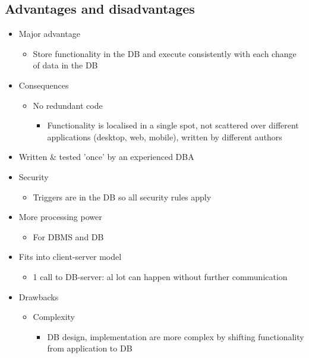 \documentclass{report}
\begin{document}
    \subsection{Advantages and disadvantages}
    \begin{itemize}
        \item Major advantage
        \begin{itemize}
            \item Store functionality in the DB and execute consistently with each change of data in the DB
        \end{itemize}
        \item Consequences
        \begin{itemize}
            \item No redundant code
            \begin{itemize}
                \item Functionality is localised in a single spot, not scattered over different applications (desktop, web, mobile), written by different authors
            \end{itemize}
        \end{itemize}
        \item Written \& tested 'once' by an experienced DBA
        \item Security
        \begin{itemize}
            \item Triggers are in the DB so all security rules apply
        \end{itemize}
        \item More processing power
        \begin{itemize}
            \item For DBMS and DB
        \end{itemize}
        \item Fits into client-server model
        \begin{itemize}
            \item 1 call to DB-server: al lot can happen without further communication
        \end{itemize}
        \item Drawbacks
        \begin{itemize}
            \item Complexity
            \begin{itemize}
                \item DB design, implementation are more complex by shifting functionality from application to DB

\end{itemize}
\end{itemize}
\end{itemize}
\end{document}
